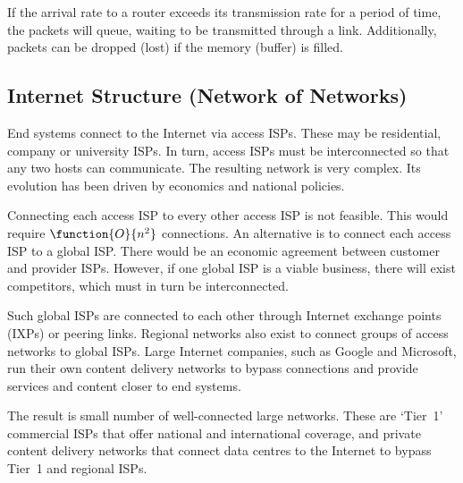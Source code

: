 If the arrival rate to a router exceeds its transmission rate for a period of time, the packets will queue, waiting to be transmitted through a link.
Additionally, packets can be dropped (lost) if the memory (buffer) is filled.

\subsection{Internet Structure (Network of Networks)}

End systems connect to the Internet via access ISPs.
These may be residential, company or university ISPs.
In turn, access ISPs must be interconnected so that any two hosts can communicate.
The resulting network is very complex.
Its evolution has been driven by economics and national policies.

Connecting each access ISP to every other access ISP is not feasible.
This would require \( \function{O}{n^2} \) connections.
An alternative is to connect each access ISP to a global ISP\@.
There would be an economic agreement between customer and provider ISPs.
However, if one global ISP is a viable business, there will exist competitors, which must in turn be interconnected.

Such global ISPs are connected to each other through Internet exchange points (IXPs) or peering links.
Regional networks also exist to connect groups of access networks to global ISPs.
Large Internet companies, such as Google and Microsoft, run their own content delivery networks to bypass connections and provide services and content closer to end systems.

The result is small number of well-connected large networks.
These are `Tier~1' commercial ISPs that offer national and international coverage, and private content delivery networks that connect data centres to the Internet to bypass Tier~1 and regional ISPs.
